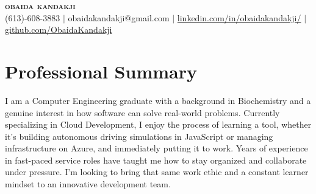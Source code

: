 \documentclass[letterpaper,10.5pt]{article}
\begin{document}

\begin{center}
    \textbf{\Huge \scshape obaida kandakji} \\ \vspace{1pt}
    \small (613)-608-3883 $|$ 
    {\small obaidakandakji@gmail.com} $|$ 
    {\small \href{https://linkedin.com/in/obaidakandakji/}{linkedin.com/in/obaidakandakji/}} $|$
    {\small \href{https://github.com/ObaidaKandakji}{github.com/ObaidaKandakji}}
\end{center}

\section{Professional Summary}
    \begin{itemize}[leftmargin=0.15in, label={}]
        \small{\item{I am a Computer Engineering graduate with a background in Biochemistry and a genuine interest in how software can solve real-world problems. Currently specializing in Cloud Development, I enjoy the process of learning a tool, whether it’s building autonomous driving simulations in JavaScript or managing infrastructure on Azure, and immediately putting it to work. Years of experience in fast-paced service roles have taught me how to stay organized and collaborate under pressure. I’m looking to bring that same work ethic and a constant learner mindset to an innovative development team.}}
    \end{itemize}
\end{document}
